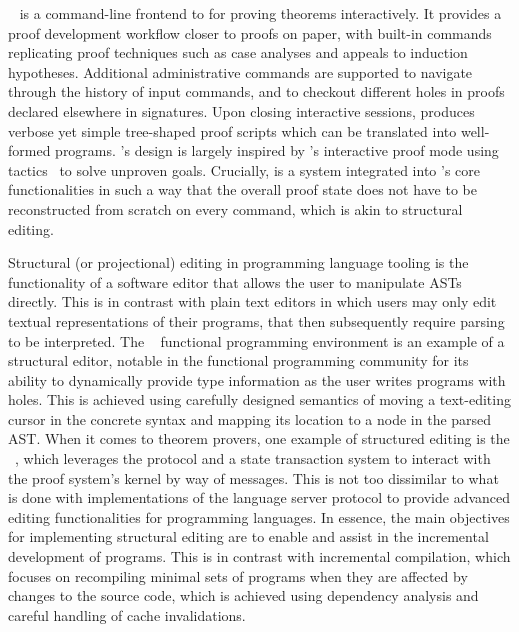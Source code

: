 
\Harpoon~\cite{errington2021harpoon} is a command-line frontend to \Beluga for proving theorems interactively.
It provides a proof development workflow closer to proofs on paper, with built-in commands replicating proof techniques such as case analyses and appeals to induction hypotheses.
Additional administrative commands are supported to navigate through the history of input commands, and to checkout different holes in proofs declared elsewhere in \Beluga signatures.
Upon closing interactive sessions, \Harpoon produces verbose yet simple tree-shaped proof scripts which can be translated into well-formed \Beluga programs.
\Harpoon's design is largely inspired by \Coq's interactive proof mode using tactics~\cite{delahaye2000tactic} to solve unproven goals.
Crucially, \Harpoon is a system integrated into \Beluga's core functionalities in such a way that the overall proof state does not have to be reconstructed from scratch on every command, which is akin to structural editing.


Structural (or projectional) editing in programming language tooling is the functionality of a software editor that allows the user to manipulate \acp{AST} directly.
This is in contrast with plain text editors in which users may only edit textual representations of their programs, that then subsequently require parsing to be interpreted.
The \Hazel~\cite{omar2017hazelnut, omar2019live} functional programming environment is an example of a structural editor, notable in the functional programming community for its ability to dynamically provide type information as the user writes programs with holes.
This is achieved using carefully designed semantics of moving a text-editing cursor in the concrete syntax and mapping its location to a node in the parsed \ac{AST}.
When it comes to theorem provers, one example of structured editing is the \CoqIDE~\cite{Coq}, which leverages the \Coq \XML protocol and a state transaction system to interact with the proof system's kernel by way of messages.
This is not too dissimilar to what is done with implementations of the language server protocol to provide advanced editing functionalities for programming languages.
In essence, the main objectives for implementing structural editing are to enable and assist in the incremental development of programs.
This is in contrast with incremental compilation, which focuses on recompiling minimal sets of programs when they are affected by changes to the source code, which is achieved using dependency analysis and careful handling of cache invalidations.

